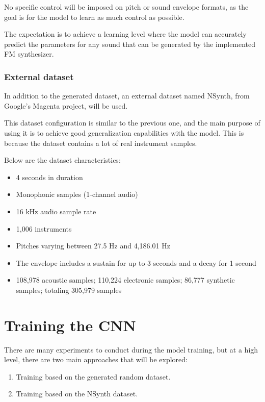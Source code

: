 \documentclass[sigconf,natbib=false]{acmart}
\begin{document}
No specific control will be imposed on pitch or sound envelope formats, as the goal is for the model to learn as much control as possible.

The expectation is to achieve a learning level where the model can accurately predict the parameters for any sound that can be generated by the implemented FM synthesizer.

\subsubsection{External dataset}

In addition to the generated dataset, an external dataset named NSynth, from Google's Magenta project, will be used.

This dataset configuration is similar to the previous one, and the main purpose of using it is to achieve good generalization capabilities with the model. This is because the dataset contains a lot of real instrument samples.

Below are the dataset characteristics:

\begin{itemize}
\item 4 seconds in duration
\item Monophonic samples (1-channel audio)
\item 16 kHz audio sample rate
\item 1,006 instruments
\item Pitches varying between 27.5 Hz and 4,186.01 Hz
\item The envelope includes a sustain for up to 3 seconds and a decay for 1 second
\item 108,978 acoustic samples; 110,224 electronic samples; 86,777 synthetic samples; totaling 305,979 samples
\end{itemize}

\section{Training the CNN}

There are many experiments to conduct during the model training, but at a high level, there are two main approaches that will be explored:

\begin{enumerate}
    \item Training based on the generated random dataset.
    \item Training based on the NSynth dataset.
\end{enumerate}
\end{document}

